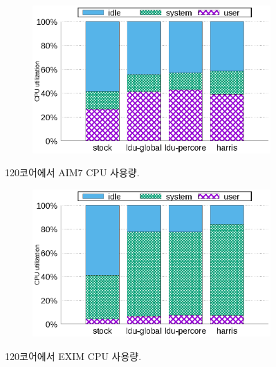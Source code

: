 \begin{figure}[tb]
    \centering
    \begin{subfigure}[b]{1\textwidth}
  \begin{center}
        \includegraphics[scale=0.7]{graph/aim7_cpuutils.eps}
  \end{center}
    \end{subfigure}%
    \centering
    \caption{120코어에서 AIM7 CPU 사용량.}
    \label{fig:utilization_aim7}
    
\end{figure}

\begin{figure}[tb]
    \centering
    \begin{subfigure}[b]{1\textwidth}
  \begin{center}
        \includegraphics[scale=0.7]{graph/exim_cpuutils.eps}
  \end{center}
    \end{subfigure}
    \centering
    \caption{120코어에서 EXIM CPU 사용량. }
    \label{fig:utilization_exim}
    
\end{figure}

